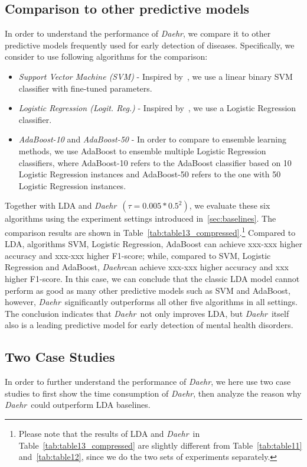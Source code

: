 \documentclass[journal,compsoc]{IEEEtran}
\newcommand{\TheName}{\mbox{\emph{Daehr}}}
\begin{document}
\subsection{Comparison to other predictive models}
In order to understand the performance of \TheName, we compare it to other predictive models frequently used for early detection of diseases. Specifically, we consider to use following algorithms for the comparison:
\begin{itemize}
\item \emph{Support Vector Machine (SVM)} -  Inspired by~\cite{xxx}, we use a  linear binary SVM classifier with fine-tuned parameters.
\item \emph{Logistic Regression (Logit. Reg.)} - Inspired by~\cite{xxx},  we use a  Logistic Regression classifier.
\item \emph{AdaBoost-10} and \emph{AdaBoost-50} - In order to compare to ensemble learning methods,  we use AdaBoost to ensemble multiple Logistic Regression classifiers, where AdaBoost-10 refers to the AdaBoost classifier based on 10 Logistic Regression instances and AdaBoost-50 refers to the one with 50 Logistic Regression instances.
\end{itemize}
Together with LDA and \TheName\ $(\tau=0.005*0.5^2)$, we evaluate these six algorithms using the experiment settings introduced in~\ref{sec:baselines}. The comparison results are shown in Table~\ref{tab:table13_compressed}.\footnote{Please note that the results of LDA and \TheName\ in Table~\ref{tab:table13_compressed} are slightly different from Table~\ref{tab:table11} and~\ref{tab:table12}, since we do the two sets of experiments separately.}  Compared to LDA,  algorithms SVM, Logistic Regression, AdaBoost can achieve xxx-xxx higher accuracy and xxx-xxx higher F1-score; while, compared to SVM, Logistic Regression and AdaBoost, \TheName can achieve xxx-xxx higher accuracy and xxx higher F1-score. In this case, we can conclude that the classic LDA model cannot perform as good as many other predictive models such as SVM and AdaBoost, however, \TheName\ significantly outperforms all other five algorithms in all settings. The conclusion indicates that \TheName\ not only improves LDA, but \TheName\ itself also is a leading predictive model for early detection of mental health disorders. 



\subsection{Two Case Studies}
In order to further understand the performance of \TheName, we here use two case studies to first show the time consumption of \TheName, then analyze the reason why \TheName\ could outperform LDA baselines.
\end{document}
